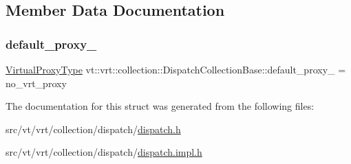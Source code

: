 \subsection{Member Data Documentation}
\mbox{\label{structvt_1_1vrt_1_1collection_1_1_dispatch_collection_base_ad192b793a3929262a6b44951b628d215}} 
\subsubsection{\texorpdfstring{default\+\_\+proxy\+\_\+}{default\_proxy\_}}
{\footnotesize\ttfamily \hyperlink{namespacevt_a1b417dd5d684f045bb58a0ede70045ac}{Virtual\+Proxy\+Type} vt\+::vrt\+::collection\+::\+Dispatch\+Collection\+Base\+::default\+\_\+proxy\+\_\+ = no\+\_\+vrt\+\_\+proxy\hspace{0.3cm}{\ttfamily [private]}}



The documentation for this struct was generated from the following files\+:\begin{DoxyCompactItemize}
\item 
src/vt/vrt/collection/dispatch/\hyperlink{src_2vt_2vrt_2collection_2dispatch_2dispatch_8h}{dispatch.\+h}\item 
src/vt/vrt/collection/dispatch/\hyperlink{src_2vt_2vrt_2collection_2dispatch_2dispatch_8impl_8h}{dispatch.\+impl.\+h}\end{DoxyCompactItemize}
